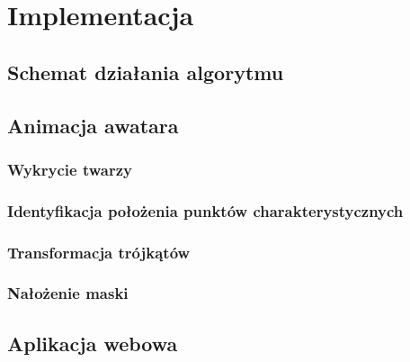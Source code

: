 \chapter{Implementacja}
\label{cha:implementacja}
\section{Schemat działania algorytmu}
\section{Animacja awatara}
\subsection{Wykrycie twarzy}
\subsection{Identyfikacja położenia punktów charakterystycznych}
\subsection{Transformacja trójkątów}
\subsection{Nałożenie maski}
\section{Aplikacja webowa}
